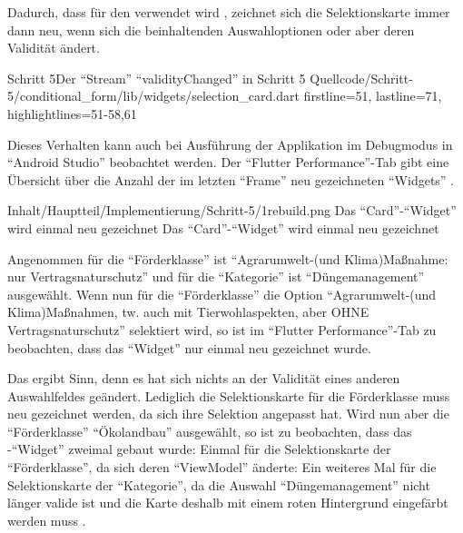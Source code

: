 Dadurch,
dass  für den  verwendet wird ,
zeichnet sich die Selektionskarte immer dann neu,
wenn sich die beinhaltenden Auswahloptionen oder aber deren Validität ändert.


\begin{alexlisting}{Schritt 5}{Der \enquote{Stream} \enquote{validityChanged} in Schritt 5}
  {Quellcode/Schritt-5/conditional_form/lib/widgets/selection_card.dart}
  {firstline=51, lastline=71, highlightlines={51-58,61}}
  \label{lst:Schritt5needsRepaint}
\end{alexlisting} 

Dieses Verhalten kann auch bei Ausführung der Applikation im Debugmodus in \enquote{Android Studio} beobachtet werden.
Der \enquote{Flutter Performance}-Tab gibt eine Übersicht über die Anzahl der im letzten \enquote{Frame} neu gezeichneten \enquote{Widgets} \Abb{\ref{fig:Schritt51rebuild}}. 
\begin{alexfigure}{Inhalt/Hauptteil/Implementierung/Schritt-5/1rebuild.png}
  {Das \enquote{Card}-\enquote{Widget} wird einmal neu gezeichnet}
  {Das \enquote{Card}-\enquote{Widget} wird einmal neu gezeichnet}

  \label{fig:Schritt51rebuild}

\end{alexfigure}
Angenommen für die \enquote{Förderklasse} ist \enquote{Agrarumwelt-(und Klima)Maßnahme: nur Vertragsnaturschutz} und für die \enquote{Kategorie} ist \enquote{Düngemanagement} ausgewählt.
Wenn nun für die \enquote{Förderklasse} die Option \enquote{Agrarumwelt-(und Klima)Maßnahmen, tw. auch mit Tierwohlaspekten, aber OHNE Vertragsnaturschutz}  selektiert wird,
so ist im \enquote{Flutter Performance}-Tab zu beobachten,
dass das \enquote{Widget}  nur einmal neu gezeichnet wurde.



Das ergibt Sinn, denn es hat sich nichts an der Validität eines anderen Auswahlfeldes geändert.
Lediglich die Selektionskarte für die Förderklasse muss neu gezeichnet werden,
da sich ihre Selektion angepasst hat.
Wird nun aber die \enquote{Förderklasse} \enquote{Ökolandbau} ausgewählt,
so ist zu beobachten,
dass das -\enquote{Widget} zweimal gebaut wurde:
Einmal für die Selektionskarte der \enquote{Förderklasse}, da sich deren \enquote{ViewModel} änderte:
Ein weiteres Mal für die Selektionskarte der \enquote{Kategorie},
da die Auswahl \enquote{Düngemanagement} nicht länger valide ist
und die Karte deshalb mit einem roten Hintergrund eingefärbt werden muss \Abb{\ref{fig:Schritt52rebuilds}}.

